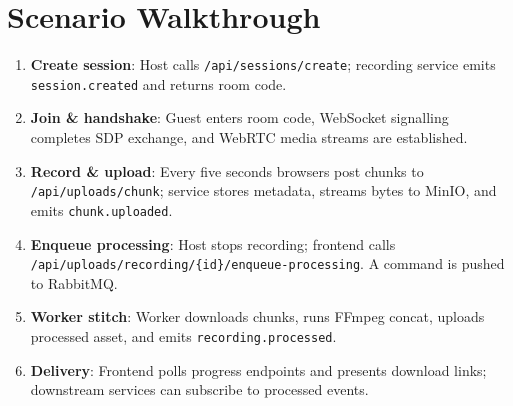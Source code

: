 \documentclass[12pt]{article}
\begin{document}
\begin{table}[H]
\centering
{}
\caption{Testing matrix summarising validation activities.}
\label{tab:tests}
\end{table}

\section{Scenario Walkthrough}\label{sec:scenario}

\begin{enumerate}[leftmargin=*]
    \item \textbf{Create session}: Host calls \texttt{/api/sessions/create}; recording service emits \texttt{session.created} and returns room code.
    \item \textbf{Join \& handshake}: Guest enters room code, WebSocket signalling completes SDP exchange, and WebRTC media streams are established.
    \item \textbf{Record \& upload}: Every five seconds browsers post chunks to \texttt{/api/uploads/chunk}; service stores metadata, streams bytes to MinIO, and emits \texttt{chunk.uploaded}.
    \item \textbf{Enqueue processing}: Host stops recording; frontend calls \texttt{/api/uploads/recording/\{id\}/enqueue-processing}. A command is pushed to RabbitMQ.
    \item \textbf{Worker stitch}: Worker downloads chunks, runs FFmpeg concat, uploads processed asset, and emits \texttt{recording.processed}.
    \item \textbf{Delivery}: Frontend polls progress endpoints and presents download links; downstream services can subscribe to processed events.
\end{enumerate}
\end{document}
